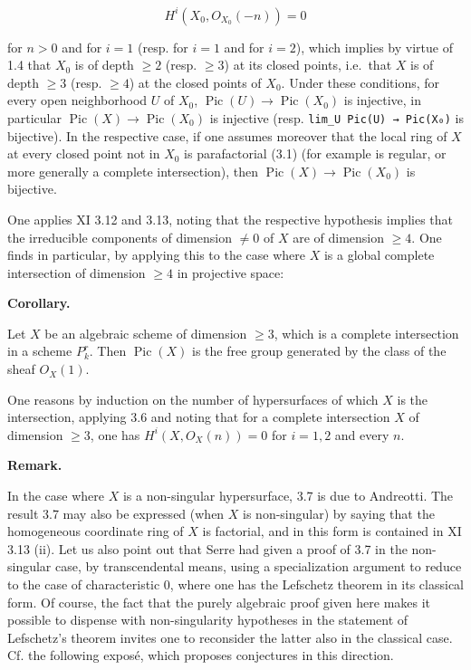 \documentclass[
  11pt,
  a4paper,
]{book}
\begin{document}
\[ H^{i}(X_{0}, O_{X_{0}}(-n)) = 0 \]

for \(n > 0\) and for \(i = 1\) (resp. for \(i = 1\) and for \(i = 2\)),
which implies by virtue of 1.4 that \(X_{0}\) is of depth
\(\geqslant 2\) (resp. \(\geqslant 3\)) at its closed points, i.e.~that
\(X\) is of depth \(\geqslant 3\) (resp. \(\geqslant 4\)) at the closed
points of \(X_{0}\). Under these conditions, for every open neighborhood
\(U\) of \(X_{0}\),
\(\operatorname{Pic}(U) \to \operatorname{Pic}(X_{0})\) is injective, in
particular \(\operatorname{Pic}(X) \to
\operatorname{Pic}(X_{0})\) is injective (resp.
\texttt{lim\_U\ Pic(U)\ →\ Pic(X₀)} is bijective). In the respective
case, if one assumes moreover that the local ring of \(X\) at every
closed point not in \(X_{0}\) is parafactorial (3.1) (for example is
regular, or more generally a complete intersection), then
\(\operatorname{Pic}(X) \to \operatorname{Pic}(X_{0})\) is bijective.

One applies XI 3.12 and 3.13, noting that the respective hypothesis
implies that the irreducible components of dimension \(\neq 0\) of \(X\)
are of dimension \(\geqslant 4\). One finds in particular, by applying
this to the case where \(X\) is a global complete intersection of
dimension \(\geqslant 4\) in projective space:

\textbf{Corollary.}

Let \(X\) be an algebraic scheme of dimension \(\geqslant 3\), which is
a complete intersection in a scheme \(P^{r}_{k}\). Then
\(\operatorname{Pic}(X)\) is the free group generated by the class of
the sheaf \(O_{X}(1)\).

One reasons by induction on the number of hypersurfaces of which \(X\)
is the intersection, applying 3.6 and noting that for a complete
intersection \(X\) of dimension \(\geqslant 3\), one has
\(H^{i}(X, O_{X}(n)) = 0\) for \(i = 1, 2\) and every \(n\).

\textbf{Remark.}

In the case where \(X\) is a non-singular hypersurface, 3.7 is due to
Andreotti. The result 3.7 may also be expressed (when \(X\) is
non-singular) by saying that the homogeneous coordinate ring of \(X\) is
factorial, and in this form is contained in XI 3.13 (ii). Let us also
point out that Serre had given a proof of 3.7 in the non-singular case,
by transcendental means, using a specialization argument to reduce to
the case of characteristic 0, where one has the Lefschetz theorem in its
classical form. Of course, the fact that the purely algebraic proof
given here makes it possible to dispense with non-singularity hypotheses
in the statement of Lefschetz's theorem invites one to reconsider the
latter also in the classical case. Cf. the following exposé, which
proposes conjectures in this direction.
\end{document}
